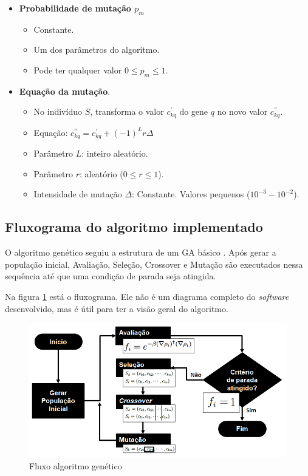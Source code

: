 	
	\begin{itemize}
		\item \textbf{Probabilidade de mutação $p_m$}
			\begin{itemize}
				\item Constante.
				\item Um dos parâmetros do algoritmo.
				\item Pode ter qualquer valor $0 \leq p_m \leq 1$.
			\end{itemize}
		\item \textbf{Equação da mutação}.
			\begin{itemize}
				\item No indivíduo $S$, transforma o valor $c^{'}_{kq}$ do gene $q$ no novo valor $c^{''}_{kq}$.
				\item Equação: $c^{''}_{kq} = c^{'}_{kq} + (-1)^{L} r \Delta$
				\item Parâmetro $L$: inteiro aleatório.
				\item Parâmetro $r$: aleatório ($0 \leq r \leq 1$).
				\item Intensidade de mutação $\Delta$: Constante. Valores pequenos ($10^{-3}-10^{-2}$).
			\end{itemize}
	\end{itemize}
	

\subsection{Fluxograma do algoritmo implementado}

	O algoritmo genético seguiu a estrutura de um GA básico \cite{Mitchell98, Linden2008}. Após gerar a população inicial, Avaliação, Seleção, Crossover e Mutação são executados nessa sequência até que uma condição de parada seja atingida.
	
	Na figura \ref{fig:fluxo} está o fluxograma. Ele não é um diagrama completo do \emph{software} desenvolvido, mas é útil para ter a visão geral do algoritmo.

\begin{figure}[htbp]
	\centering
		\includegraphics[width=1.00\textwidth]{figs/materiais_metodo/autovalores_com_ga/fluxo.png}
	\caption{Fluxo algoritmo genético}
	\label{fig:fluxo}
\end{figure}


